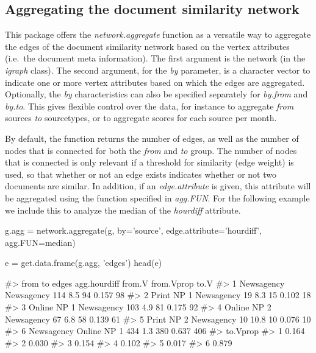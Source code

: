 \subsection{Aggregating the document similarity network}

This package offers the \emph{network.aggregate} function as a versatile
way to aggregate the edges of the document similarity network based on
the vertex attributes (i.e.~the document meta information). The first
argument is the network (in the \emph{igraph} class). The second
argument, for the \emph{by} parameter, is a character vector to indicate
one or more vertex attributes based on which the edges are aggregated.
Optionally, the \emph{by} characteristics can also be specified
separately for \emph{by.from} and \emph{by.to}. This gives flexible
control over the data, for instance to aggregate \emph{from} sources
\emph{to} sourcetypes, or to aggregate scores for each source per month.

By default, the function returns the number of edges, as well as the
number of nodes that is connected for both the \emph{from} and \emph{to}
group. The number of nodes that is connected is only relevant if a
threshold for similarity (edge weight) is used, so that whether or not
an edge exists indicates whether or not two documents are similar. In
addition, if an \emph{edge.attribute} is given, this attribute will be
aggregated using the function specified in \emph{agg.FUN}. For the
following example we include this to analyze the median of the
\emph{hourdiff} attribute.

\begin{Schunk}
\begin{Sinput}
g.agg = network.aggregate(g, by='source', edge.attribute='hourdiff', agg.FUN=median)

e = get.data.frame(g.agg, 'edges')
head(e)
\end{Sinput}
\begin{Soutput}
#>          from          to edges agg.hourdiff from.V from.Vprop to.V
#> 1  Newsagency  Newsagency   114          8.5     94      0.157   98
#> 2  Print NP 1  Newsagency    19          8.3     15      0.102   18
#> 3 Online NP 1  Newsagency   103          4.9     81      0.175   92
#> 4 Online NP 2  Newsagency    67          6.8     58      0.139   61
#> 5  Print NP 2  Newsagency    10         10.8     10      0.076   10
#> 6  Newsagency Online NP 1   434          1.3    380      0.637  406
#>   to.Vprop
#> 1    0.164
#> 2    0.030
#> 3    0.154
#> 4    0.102
#> 5    0.017
#> 6    0.879
\end{Soutput}
\end{Schunk}


